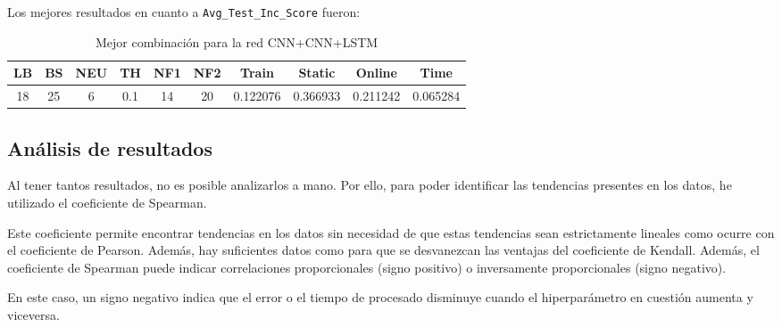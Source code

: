 \documentclass{article}
\begin{document}
Los mejores resultados en cuanto a \texttt{Avg\_Test\_Inc\_Score} fueron:

\begin{table}[h]
	\centering
	\caption{Mejor combinación para la red CNN+CNN+LSTM}
	\begin{tabular}{cccccccccc}
		\toprule
		\textbf{LB} & \textbf{BS} & \textbf{NEU} & \textbf{TH} & \textbf{NF1} & \textbf{NF2} & \textbf{Train} & \textbf{Static} & \textbf{Online} & \textbf{Time} \\
		\midrule
		18 & 25 & 6 & 0.1 & 14 & 20 & 0.122076 & 0.366933 & 0.211242 & 0.065284\\
		\bottomrule
	\end{tabular}
\end{table}

\subsection{Análisis de resultados}
Al tener tantos resultados, no es posible analizarlos a mano. Por ello, para poder identificar las tendencias presentes en los datos, he utilizado el coeficiente de Spearman.

Este coeficiente permite encontrar tendencias en los datos sin necesidad de que estas tendencias sean estrictamente lineales como ocurre con el coeficiente de Pearson. Además, hay suficientes datos como para que se desvanezcan las ventajas del coeficiente de Kendall. Además, el coeficiente de Spearman puede indicar correlaciones proporcionales (signo positivo) o inversamente proporcionales (signo negativo).

En este caso, un signo negativo indica que el error o el tiempo de procesado disminuye cuando el hiperparámetro en cuestión aumenta y viceversa.
\end{document}
